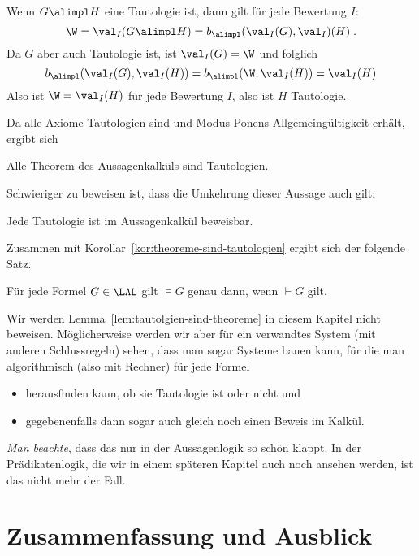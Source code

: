 \begin{beweis}
  Wenn $G\alimpl H$
  eine Tautologie ist, dann gilt für jede Bewertung $I$:
  \[
    \W=\val_I(G\alimpl H)= b_{\alimpl}(\val_I(G), \val_I)(H) \;.
  \]
  Da $G$ aber auch Tautologie ist, ist $\val_I(G)=\W$ und folglich
  \[
    b_{\alimpl}(\val_I(G), \val_I(H))= b_{\alimpl}(\W, \val_I(H)) = \val_I(H)
  \]
  Also ist $\W=\val_I(H)$
  für jede Bewertung $I$, also ist $H$ Tautologie.
\end{beweis}

\noindent
Da alle Axiome Tautologien sind und Modus Ponens Allgemeingültigkeit
erhält, ergibt sich
\begin{korollar}
  \label{kor:theoreme-sind-tautologien}
  Alle Theorem des Aussagenkalküls sind Tautologien.
\end{korollar}

\noindent
Schwieriger zu beweisen ist, dass die Umkehrung dieser Aussage auch
gilt:
\begin{lemma}
  \label{lem:tautolgien-sind-theoreme}
  Jede Tautologie ist im Aussagenkalkül beweisbar.
\end{lemma}

\noindent
Zusammen mit Korollar~\ref{kor:theoreme-sind-tautologien} ergibt sich
der folgende Satz.
%
\begin{theorem}
  Für jede Formel $G\in\LAL$
  gilt $\models G$ genau dann, wenn $\vdash G$ gilt.
\end{theorem}

\noindent
Wir werden Lemma~\ref{lem:tautolgien-sind-theoreme} in diesem Kapitel
nicht beweisen.
%
Möglicherweise werden wir aber für ein verwandtes System (mit anderen
Schlussregeln) sehen, dass man sogar Systeme bauen kann, für die man
algorithmisch (\dh also mit Rechner) für jede Formel 
\begin{itemize}
\item herausfinden kann, ob sie Tautologie ist oder nicht und
\item gegebenenfalls dann sogar auch gleich noch einen Beweis im
  Kalkül.
\end{itemize}
%
\emph{Man beachte}, dass das nur in der Aussagenlogik so schön klappt.
%
In der Prädikatenlogik, die wir in einem späteren Kapitel auch noch
ansehen werden, ist das nicht mehr der Fall.

\section*{Zusammenfassung und Ausblick}

